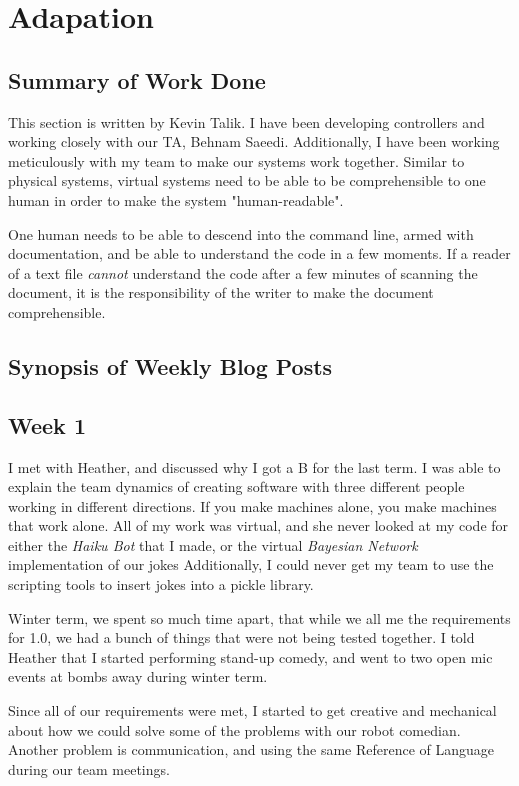 \documentclass[onecolumn, draftclsnofoot,10pt, compsoc]{IEEEtran}
\begin{document}
\section{Adapation}
\subsection{Summary of Work Done}
 This section is written by Kevin Talik. I have been developing controllers and working closely with our TA, Behnam Saeedi. Additionally, I have been working meticulously with my team to make our systems work together. Similar to physical systems, virtual systems need to be able to be comprehensible to one human in order to make the system "human-readable".

 One human needs to be able to descend into the command line, armed with documentation, and be able to understand the code in a few moments. If a reader of a text file \textit{cannot} understand the code after a few minutes of scanning the document, it is the responsibility of the writer to make the document comprehensible.
 \subsection{Synopsis of Weekly Blog Posts}

 \subsection{Week 1} I met with Heather, and discussed why I got a B for the last term. I was able to explain the team dynamics of creating software with three different people working in different directions. If you make machines alone, you make machines that work alone. All of my work was virtual, and she never looked at my code for either the \textit{Haiku Bot} that I made, or the virtual \textit{Bayesian Network} implementation of our jokes Additionally, I could never get my team to use the scripting tools to insert jokes into a pickle library.

Winter term, we spent so much time apart, that while we all me the requirements for 1.0, we had a bunch of things that were not being tested together. I told Heather that I started performing stand-up comedy, and went to two open mic events at bombs away during winter term.

Since all of our requirements were met, I started to get creative and mechanical about how we could solve some of the problems with our robot comedian. Another problem is communication, and using the same Reference of Language during our team meetings.
\end{document}
